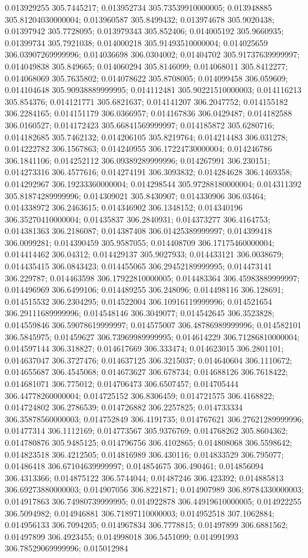 0.013929255 305.7445217; 0.013952734 305.73539910000005; 0.013948885 305.81204030000004; 0.013960587 305.8499432; 0.013974678 305.9020438; 0.01397942 305.7728095; 0.013979343 305.852406; 0.014005192 305.9660935; 0.01399734 305.7921038; 0.014000218 305.91493510000004; 0.014025659 306.03907269999996; 0.014036698 306.0304002; 0.01404702 305.91737639999997; 0.014049838 305.849665; 0.014060294 305.8146099; 0.014068011 305.8412277; 0.014068069 305.7635802; 0.014078622 305.8708005; 0.014099458 306.059609; 0.014104648 305.90938889999995; 0.014112481 305.90221510000003; 0.014116213 305.854376; 0.014121771 305.6821637; 0.014141207 306.2047752; 0.014155182 306.2284165; 0.014151179 306.0366957; 0.014167836 306.0429487; 0.014182588 306.0160527; 0.014172423 305.66841569999997; 0.014185872 305.6280716; 0.014182685 305.7462132; 0.014206105 305.8219764; 0.014214483 306.031278; 0.014222782 306.1567863; 0.014240955 306.17224730000004; 0.014246786 306.1841106; 0.014252112 306.09389289999996; 0.014267991 306.230151; 0.014273316 306.4577616; 0.014274191 306.3093832; 0.014284628 306.1469358; 0.014292967 306.19233360000004; 0.014298544 305.97288180000004; 0.014311392 305.81874289999996; 0.014309021 305.8430907; 0.014330906 306.03464; 0.014338972 306.2463615; 0.014346902 306.1348152; 0.014340196 306.35270410000004; 0.01435837 306.2840931; 0.014373277 306.4164753; 0.014381363 306.2186087; 0.014387408 306.01425389999997; 0.014399418 306.0099281; 0.014390459 305.9587055; 0.014408709 306.17175460000004; 0.014414462 306.04312; 0.014429137 305.9027933; 0.014433121 306.0038679; 0.014435415 306.0843423; 0.014455065 306.29452189999995; 0.014473141 306.229787; 0.014463598 306.17922810000005; 0.014483364 306.45983889999997; 0.014496969 306.6499106; 0.014489255 306.248096; 0.014498116 306.128691; 0.014515532 306.2304295; 0.014522004 306.10916119999996; 0.014521654 306.29111689999996; 0.014548146 306.3049077; 0.014542645 306.3523828; 0.014559846 306.59078619999997; 0.014575007 306.48786989999996; 0.014582101 306.5845975; 0.01459627 306.73969989999995; 0.014614229 306.71286810000004; 0.014597144 306.318827; 0.014617669 306.333474; 0.014623015 306.2801101; 0.014637047 306.3727476; 0.014637125 306.3215037; 0.014640604 306.1110672; 0.014655687 306.4545068; 0.014673627 306.678734; 0.014688126 306.7618422; 0.014681071 306.775012; 0.014706473 306.6507457; 0.014705444 306.44778260000004; 0.014725152 306.8306459; 0.014721575 306.4168822; 0.014724802 306.2786539; 0.014726882 306.2257825; 0.014733334 306.35878560000003; 0.014752849 306.4191735; 0.014767621 306.27621289999996; 0.01477314 306.1112169; 0.014773567 305.9376769; 0.014768262 305.8604362; 0.014780876 305.9485125; 0.014796756 306.4102865; 0.014808068 306.5598642; 0.014823518 306.4212505; 0.014816989 306.430116; 0.014833529 306.795077; 0.01486418 306.67104639999997; 0.014854675 306.490461; 0.014856094 306.4313366; 0.014875122 306.5744044; 0.01487246 306.423392; 0.014885813 306.69273880000003; 0.014907056 306.8221871; 0.014907989 306.89784330000003; 0.014917863 306.74980739999995; 0.014922878 306.44919610000005; 0.014922255 306.5094982; 0.014946881 306.71897110000003; 0.014952518 307.1062884; 0.014956133 306.7094205; 0.014967834 306.7778815; 0.01497899 306.6881562; 0.01497899 306.4923455; 0.014998018 306.5451099; 0.014991993 306.78529069999996; 0.015012984 